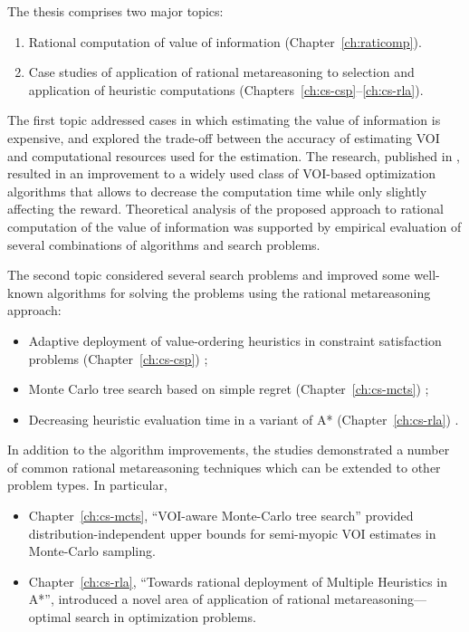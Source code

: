 The thesis comprises two major topics:
\begin {enumerate}
\item Rational computation of value of information (Chapter~\ref{ch:raticomp}).
\item Case studies of application of rational metareasoning to
  selection and application of heuristic computations (Chapters~\ref{ch:cs-csp}--\ref{ch:cs-rla}).
\end {enumerate}

The first topic addressed cases in which estimating the value of
information is expensive, and explored the trade-off between the
accuracy of estimating VOI and computational resources used for the
estimation. The research, published in \cite{TolpinShimony.raticomp},
resulted in an improvement to a widely used class of VOI-based
optimization algorithms that allows to decrease the computation time
while only slightly affecting the reward. Theoretical analysis of the
proposed approach to rational computation of the value of information
was supported by empirical evaluation of several combinations of
algorithms and search problems.

The second topic considered several search problems and improved some
well-known algorithms for solving the problems using the rational
metareasoning approach:
\begin {itemize}
\item Adaptive deployment of value-ordering heuristics in constraint
  satisfaction problems (Chapter~\ref{ch:cs-csp}) \cite{TolpinShimony.csp};
\item Monte Carlo tree search based on simple regret
  (Chapter~\ref{ch:cs-mcts}) \cite{TolpinShimony.mcts,HayRussellTolpinShimony.selecting};
\item Decreasing heuristic evaluation time in a variant of A*
  (Chapter~\ref{ch:cs-rla}) \cite{TolpinEtAl.rla}. 
\end {itemize}
In addition to the algorithm improvements, the studies demonstrated a
number of common rational metareasoning techniques which can be 
extended to other problem types. In particular,
\begin{itemize}
\item Chapter~\ref{ch:cs-mcts}, ``VOI-aware Monte-Carlo tree search''
provided distribution-independent upper bounds for semi-myopic VOI
estimates in Monte-Carlo sampling.
\item Chapter~\ref{ch:cs-rla}, ``Towards rational deployment of Multiple
Heuristics in A*'', introduced a novel area of application of rational
metareasoning---optimal search in optimization problems.
\end{itemize}

